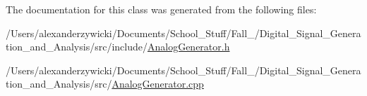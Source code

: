 The documentation for this class was generated from the following files\+:\begin{DoxyCompactItemize}
\item 
/\+Users/alexanderzywicki/\+Documents/\+School\+\_\+\+Stuff/\+Fall\+\_/\+Digital\+\_\+\+Signal\+\_\+\+Generation\+\_\+and\+\_\+\+Analysis/src/include/\hyperlink{AnalogGenerator_8h}{Analog\+Generator.\+h}\item 
/\+Users/alexanderzywicki/\+Documents/\+School\+\_\+\+Stuff/\+Fall\+\_/\+Digital\+\_\+\+Signal\+\_\+\+Generation\+\_\+and\+\_\+\+Analysis/src/\hyperlink{AnalogGenerator_8cpp}{Analog\+Generator.\+cpp}\end{DoxyCompactItemize}
